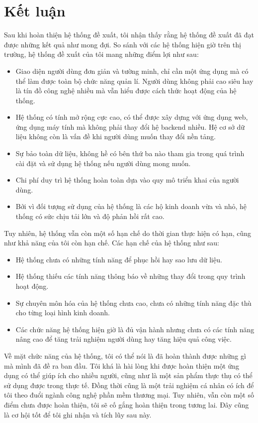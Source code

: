 \documentclass[../DoAn.tex]{subfiles}
\begin{document}
\section{Kết luận}

Sau khi hoàn thiện hệ thống đề xuất, tôi nhận thấy rằng hệ thống đề xuất đã đạt được những kết quả như mong đợi. So sánh với các hệ thống hiện giờ trên thị trường, hệ thống đề xuất của tôi mang những điểm lợi như sau:
\begin{itemize}
    \item Giao diện người dùng đơn giản và tường minh, chỉ cần một ứng dụng mà có thể làm được toàn bộ chức năng quản lí. Người dùng không phải cao siêu hay là tín đồ công nghệ nhiều mà vẫn hiểu được cách thức hoạt động của hệ thống.
    \item Hệ thống có tính mở rộng cực cao, có thể được xây dựng với ứng dụng web, ứng dụng máy tính mà không phải thay đổi hệ backend nhiều. Hệ cơ sở dữ liệu không còn là vấn đề khi người dùng muốn thay đổi nền tảng.
    \item Sự bảo toàn dữ liệu, không hề có bên thứ ba nào tham gia trong quá trình cài đặt và sử dụng hệ thống nếu người dùng mong muốn.
    \item Chi phí duy trì hệ thống hoàn toàn dựa vào quy mô triển khai của người dùng.
    \item Bởi vì đối tượng sử dụng của hệ thống là các hộ kinh doanh vừa và nhỏ, hệ thống có sức chịu tải lớn và độ phản hồi rất cao.
\end{itemize}
Tuy nhiên, hệ thống vẫn còn một số hạn chế do thời gian thực hiện có hạn, cũng như khả năng của tôi còn hạn chế. Các hạn chế của hệ thống như sau:
\begin{itemize}
    \item Hệ thống chưa có những tính năng để phục hồi hay sao lưu dữ liệu.
    \item Hệ thống thiếu các tính năng thông báo về những thay đổi trong quy trình hoạt động.
    \item Sự chuyên môn hóa của hệ thống chưa cao, chưa có những tính năng đặc thù cho từng loại hình kinh doanh.
    \item Các chức năng hệ thống hiện giờ là đủ vận hành nhưng chưa có các tính năng nâng cao để tăng trải nghiệm người dùng hay tăng hiệu quả công việc.
\end{itemize}
Về mặt chức năng của hệ thống, tôi có thể nói là đã hoàn thành được những gì mà mình đã đề ra ban đầu. Tôi khá là hài lòng khi được hoàn thiện một ứng dụng có thể giúp ích cho nhiều người, cũng như là một sản phẩm thực thụ có thể sử dụng được trong thực tế. Đồng thời cũng là một trải nghiệm cá nhân có ích để tôi theo đuổi ngành công nghệ phần mềm thương mại. Tuy nhiên, vẫn còn một số điểm chưa được hoàn thiện, tôi sẽ cố gắng hoàn thiện trong tương lai. Đây cũng là cơ hội tốt để tôi ghi nhận và tích lũy sau này.
\vfill
\break
\end{document}
